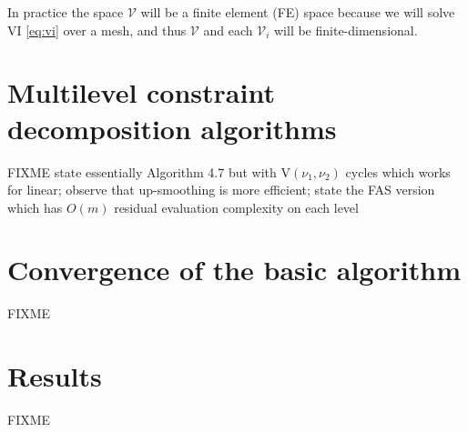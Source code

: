 \documentclass[letterpaper,final,12pt,reqno]{amsart}
\theoremstyle{cstyle}
\theoremstyle{dstyle}
\numberwithin{equation}{section}
\numberwithin{figure}{section}
\numberwithin{table}{section}
\numberwithin{theorem}{section}
\newcommand{\cV}{\mathcal{V}}
\begin{document}
In practice the space $\cV$ will be a finite element (FE) space because we will solve VI \eqref{eq:vi} over a mesh, and thus $\cV$ and each $\cV_i$ will be finite-dimensional.


\section{Multilevel constraint decomposition algorithms} \label{sec:multilevel}

FIXME state essentially Algorithm 4.7 \cite{GraeserKornhuber2009} but with $\text{V}(\nu_1,\nu_2)$ cycles which works for linear; observe that up-smoothing is more efficient; state the FAS version which has $O(m)$ residual evaluation complexity on each level


\section{Convergence of the basic algorithm} \label{sec:convergence}

FIXME


\section{Results} \label{sec:results}

FIXME


\small

\bigskip


\end{document}
